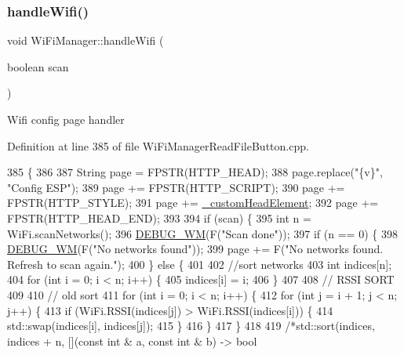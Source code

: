 \subsubsection{\texorpdfstring{handle\+Wifi()}{handleWifi()}}
{\footnotesize\ttfamily void Wi\+Fi\+Manager\+::handle\+Wifi (\begin{DoxyParamCaption}\item[{boolean}]{scan }\end{DoxyParamCaption})\hspace{0.3cm}{\ttfamily [private]}}

Wifi config page handler 

Definition at line 385 of file Wi\+Fi\+Manager\+Read\+File\+Button.\+cpp.


\begin{DoxyCode}
385                                          \{
386 
387   String page = FPSTR(HTTP\_HEAD);
388   page.replace(\textcolor{stringliteral}{"\{v\}"}, \textcolor{stringliteral}{"Config ESP"});
389   page += FPSTR(HTTP\_SCRIPT);
390   page += FPSTR(HTTP\_STYLE);
391   page += \hyperlink{class_wi_fi_manager_a8860012564a62209d750c50e56319192}{\_customHeadElement};
392   page += FPSTR(HTTP\_HEAD\_END);
393 
394   \textcolor{keywordflow}{if} (scan) \{
395     \textcolor{keywordtype}{int} n = WiFi.scanNetworks();
396     \hyperlink{class_wi_fi_manager_ae5f595c670ccbcf9a191baf50f5c7c26}{DEBUG\_WM}(F(\textcolor{stringliteral}{"Scan done"}));
397     \textcolor{keywordflow}{if} (n == 0) \{
398       \hyperlink{class_wi_fi_manager_ae5f595c670ccbcf9a191baf50f5c7c26}{DEBUG\_WM}(F(\textcolor{stringliteral}{"No networks found"}));
399       page += F(\textcolor{stringliteral}{"No networks found. Refresh to scan again."});
400     \} \textcolor{keywordflow}{else} \{
401 
402       \textcolor{comment}{//sort networks}
403       \textcolor{keywordtype}{int} indices[n];
404       \textcolor{keywordflow}{for} (\textcolor{keywordtype}{int} i = 0; i < n; i++) \{
405         indices[i] = i;
406       \}
407 
408       \textcolor{comment}{// RSSI SORT}
409 
410       \textcolor{comment}{// old sort}
411       \textcolor{keywordflow}{for} (\textcolor{keywordtype}{int} i = 0; i < n; i++) \{
412         \textcolor{keywordflow}{for} (\textcolor{keywordtype}{int} j = i + 1; j < n; j++) \{
413           \textcolor{keywordflow}{if} (WiFi.RSSI(indices[j]) > WiFi.RSSI(indices[i])) \{
414             std::swap(indices[i], indices[j]);
415           \}
416         \}
417       \}
418 
419       \textcolor{comment}{/*std::sort(indices, indices + n, [](const int & a, const int & b) -> bool}

\end{DoxyCode}
